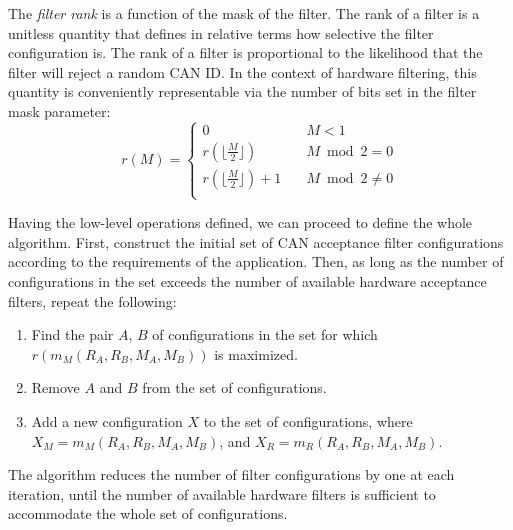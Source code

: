 The \emph{filter rank} is a function of the mask of the filter.
The rank of a filter is a unitless quantity that defines in relative terms how selective the filter configuration is.
The rank of a filter is proportional to the likelihood that the filter will reject a random CAN ID.
In the context of hardware filtering, this quantity is conveniently representable via the number of bits set in
the filter mask parameter:
\begin{equation*}
r(M) =
\begin{cases}
    0                                   & \quad M < 1 \\
    r(\lfloor\frac{M}{2}\rfloor)        & \quad M \bmod 2 = 0 \\
    r(\lfloor\frac{M}{2}\rfloor) + 1    & \quad M \bmod 2 \neq 0 \\
\end{cases}
\end{equation*}

Having the low-level operations defined, we can proceed to define the whole algorithm.
First, construct the initial set of CAN acceptance filter configurations
according to the requirements of the application.
Then, as long as the number of configurations in the set exceeds the number of available hardware acceptance filters,
repeat the following:
\begin{enumerate}
    \item Find the pair $A$, $B$ of configurations in the set for which $r(m_M(R_A, R_B, M_A, M_B))$ is maximized.
    \item Remove $A$ and $B$ from the set of configurations.
    \item Add a new configuration $X$ to the set of configurations, where
    $X_M = m_M(R_A, R_B, M_A, M_B)$, and $X_R = m_R(R_A, R_B, M_A, M_B)$.
\end{enumerate}

The algorithm reduces the number of filter configurations by one at each iteration,
until the number of available hardware filters is sufficient to accommodate the whole set of configurations.
